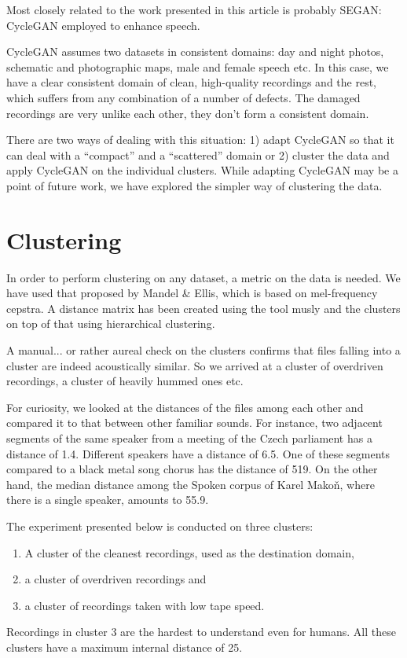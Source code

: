\documentclass[runningheads,a4paper]{llncs}
\begin{document}
Most closely related to the work presented in this article is probably
SEGAN\cite{pascual2017segan}: CycleGAN employed to enhance speech.

CycleGAN assumes two datasets in consistent domains: day and night photos,
schematic and photographic maps, male and female speech etc. In this case,
we have a clear consistent domain of clean, high-quality recordings and the
rest, which suffers from any combination of a number of defects. The damaged
recordings are very unlike each other, they don't form a consistent domain.

There are two ways of dealing with this situation: 1) adapt CycleGAN so that it
can deal with a ``compact'' and a ``scattered'' domain or 2) cluster the
data and apply CycleGAN on the individual clusters. While adapting CycleGAN may be a
point of future work, we have explored the simpler way of clustering the data.

\section{Clustering}

In order to perform clustering on any dataset, a metric on the data is needed.
We have used that proposed by Mandel \& Ellis\cite{mandel2005song}, which
is based on mel-frequency cepstra. A distance matrix has been created using the
tool musly\cite{schnitzer2011using} and the clusters on top of that using
hierarchical clustering\cite{johnson1967hierarchical}.

A manual... or rather aureal check on the clusters confirms that files falling
into a cluster are indeed acoustically similar. So we arrived at a cluster of
overdriven recordings, a cluster of heavily hummed ones etc.

For curiosity, we looked at the distances of the files among each other and
compared it to that between other familiar sounds. For instance, two adjacent
segments of the same speaker from a meeting of the Czech parliament has a
distance of 1.4. Different speakers have a distance of 6.5. One of these
segments compared to a black metal song chorus has the distance of 519. On the
other hand, the median distance among the Spoken corpus of Karel Makoň, where
there is a single speaker, amounts to 55.9.

The experiment presented below is conducted on three clusters:
\begin{enumerate}
\item{A cluster of the cleanest recordings, used as the destination domain,}
\item{a cluster of overdriven recordings and}
\item{a cluster of recordings taken with low tape speed.}
\end{enumerate}
Recordings in cluster 3 are the hardest to understand even for humans. All these
clusters have a maximum internal distance of 25.
\end{document}
